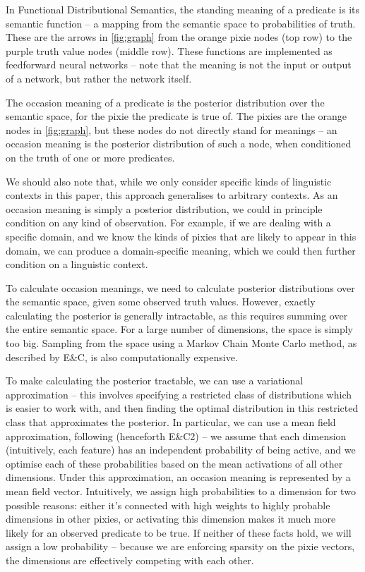 \documentclass[a4paper,11pt]{article}
\begin{document}
In Functional Distributional Semantics,
the standing meaning of a predicate is its semantic function --
a mapping from the semantic space to probabilities of truth.
These are the arrows in \cref{fig:graph}
from the orange pixie nodes (top row) to the purple truth value nodes (middle row).
These functions are implemented as feedforward neural networks --
note that the meaning is not the input or output of a network, but rather the network itself.

The occasion meaning of a predicate
is the posterior distribution over the semantic space,
for the pixie the predicate is true of.
The pixies are the orange nodes in \cref{fig:graph},
but these nodes do not directly stand for meanings --
an occasion meaning is the posterior distribution of such a node,
when conditioned on the truth of one or more predicates.

We should also note that,
while we only consider specific kinds of linguistic contexts in this paper,
this approach generalises to arbitrary contexts.
As an occasion meaning is simply a posterior distribution,
we could in principle condition on any kind of observation.
For example, if we are dealing with a specific domain,
and we know the kinds of pixies that are likely to appear in this domain,
we can produce a domain-specific meaning,
which we could then further condition on a linguistic context.

To calculate occasion meanings,
we need to calculate posterior distributions over the semantic space,
given some observed truth values.
However, exactly calculating the posterior is generally intractable,
as this requires summing over the entire semantic space.
For a large number of dimensions, the space is simply too big.
Sampling from the space using a Markov Chain Monte Carlo method,
as described by E\&C,
is also computationally expensive.

To make calculating the posterior tractable,
we can use a variational approximation --
this involves specifying a restricted class of distributions which is easier to work with,
and then finding the optimal distribution in this restricted class
that approximates the posterior.
In particular, we can use a mean field approximation,
following \citet{emerson2017} (henceforth E\&C2) --
we assume that each dimension (intuitively, each feature)
has an independent probability of being active,
and we optimise each of these probabilities based on the mean activations of all other dimensions.
Under this approximation, an occasion meaning is represented by a mean field vector.
Intuitively, we assign high probabilities to a dimension for two possible reasons:
either it's connected with high weights to highly probable dimensions in other pixies,
or activating this dimension makes it much more likely for an observed predicate to be true.
If neither of these facts hold, we will assign a low probability --
because we are enforcing sparsity on the pixie vectors,
the dimensions are effectively competing with each other.
\end{document}
